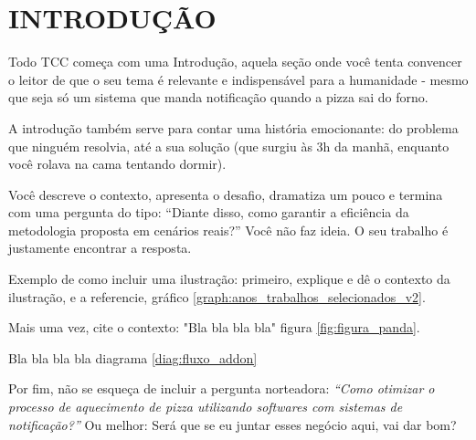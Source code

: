 \chapter{INTRODUÇÃO}
\label{chap:contextualizacao}

Todo TCC começa com uma Introdução, aquela seção onde você tenta convencer o leitor de que o seu tema é relevante e indispensável para a humanidade - mesmo que seja só um sistema que manda notificação quando a pizza sai do forno.

A introdução também serve para contar uma história emocionante: do problema que ninguém resolvia, até a sua solução (que surgiu às 3h da manhã, enquanto você rolava na cama tentando dormir).

Você descreve o contexto, apresenta o desafio, dramatiza um pouco e termina com uma pergunta do tipo: \enquote{Diante disso, como garantir a eficiência da metodologia proposta em cenários reais?} Você não faz ideia. O seu trabalho é justamente encontrar a resposta.

Exemplo de como incluir uma ilustração: primeiro, explique e dê o contexto da ilustração, e a referencie, gráfico \ref{graph:anos_trabalhos_selecionados_v2}.



Mais uma vez, cite o contexto: "Bla bla bla bla" figura \ref{fig:figura_panda}.




Bla bla bla bla diagrama \ref{diag:fluxo_addon}



Por fim, não se esqueça de incluir a pergunta norteadora: \textit{\enquote{Como otimizar o processo de aquecimento de pizza utilizando softwares com sistemas de notificação?}} Ou melhor: Será que se eu juntar esses negócio aqui, vai dar bom?
